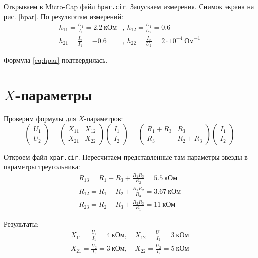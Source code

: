 \documentclass[a4paper, 12pt]{article}
\begin{document}
Открываем в Micro-Cap файл \texttt{hpar.cir}. Запускаем измерения. Снимок экрана
на рис. \ref{hpar}. По результатам измерений:
\begin{align*}
  h_{11} = \frac{U_1}{I_1} = 2.2\ \text{кОм} &,\ h_{12} = \frac{U_1}{U_2} = 0.6\\
  h_{21} = \frac{I_2}{I_1} = -0.6&,\ h_{22} = \frac{I_2}{U_2} = 2\cdot10^{-4}\ \text{Ом}^{-1}
\end{align*}

Формула \ref{eq:hpar} подтвердилась.

\section{$X$-параметры}
Проверим формулы для $X$-параметров:
\begin{equation}
  \begin{pmatrix}
    U_1 \\
    U_2
  \end{pmatrix}
  =
  \begin{pmatrix}
    X_{11} & X_{12} \\
    X_{21} & X_{22}
  \end{pmatrix}
  \begin{pmatrix}
    I_1\\
    I_2
  \end{pmatrix}
  =
  \begin{pmatrix}
    R_1 + R_3 & R_3 \\
    R_3 & R_2 + R_3
  \end{pmatrix}
  \begin{pmatrix}
    I_1 \\
    I_2
  \end{pmatrix}
  \label{eq:xpar}
\end{equation}

Откроем файл \texttt{xpar.cir}. Пересчитаем представленные там параметры звезды
в параметры треугольника:
\begin{eqnarray*}
  R_{13} = R_1 + R_3 + \frac{R_1R_3}{R_2} = 5.5\ \text{кОм}\\
  R_{12} = R_1 + R_2 + \frac{R_1R_2}{R_3} = 3.67\ \text{кОм}\\
  R_{23} = R_2 + R_3 + \frac{R_2R_3}{R_1} = 11\ \text{кОм}
\end{eqnarray*}

Результаты:
\begin{align*}
  X_{11} = \frac{U_1}{I_1} = 4\ \text{кОм}, &\ X_{12} = \frac{U_1}{I_2} = 3\ \text{кОм}\\
  X_{21} = \frac{U_2}{I_1} = 3\ \text{кОм}, &\ X_{22} = \frac{U_2}{I_2} = 5\ \text{кОм}
\end{align*}
\end{document}
